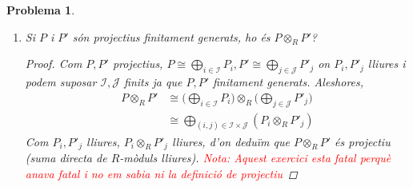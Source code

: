 \documentclass[compress]{article}
\newtheorem{problema}{Problema}
\theoremstyle{definition}
\begin{document}
\begin{problema}
\begin{enumerate}
\begin{proof}[Solució]
\begin{align*}
                &=(R\oplus R^{n-1})\otimes_{R}R^{m}\\
                &\cong(R\otimes_{R}R^{m})\oplus(R^{n-1}\otimes_{R}R^{m})
                &\quad&\textrm{($(M\oplus M')\otimes_{R}N\cong(M\otimes_{R}N)\oplus(M'\otimes_{R}N)$)}\\
                &\cong R^{m}\oplus R^{m(n-1)}
                &\quad&\textrm{(Hipòtesi d'inducció)}\\
                &=R^{nm}
            \end{align*}
            com volíem veure.
        \end{proof}
        \item Si $P$ i $P'$ són projectius finitament generats, ho és $P\otimes_{R}P'$?
        \begin{proof}
            Com $P,P'$ projectius, $P\cong\bigoplus_{i\in\mathscr{I}}P_{i},P'\cong\bigoplus_{j\in\mathscr{J}}P'_{j}$ on $P_{i},P'_{j}$ lliures i podem suposar $\mathscr{I},\mathscr{J}$ finits ja que $P,P'$ finitament generats. Aleshores,
            \begin{align*}
                P\otimes_{R}P'
                &\cong\big(\bigoplus_{i\in\mathscr{I}}P_{i}\big)
                \otimes_{R}\big(\bigoplus_{j\in\mathscr{J}}P'_{j}\big)\\
                &\cong\bigoplus_{(i,j)\in\mathscr{I}\times\mathscr{J}}(P_{i}\otimes_{R}P'_{j})
            \end{align*}
            Com $P_{i},P'_{j}$ lliures, $P_{i}\otimes_{R}P'_{j}$ lliures, d'on deduïm que $P\otimes_{R}P'$ és projectiu (suma directa de $R$-mòduls lliures). \textcolor{red}{Nota: Aquest exercici esta fatal perquè anava fatal i no em sabia ni la definició de projectiu}
        \end{proof}
    \end{enumerate}
\end{problema}
\end{document}
